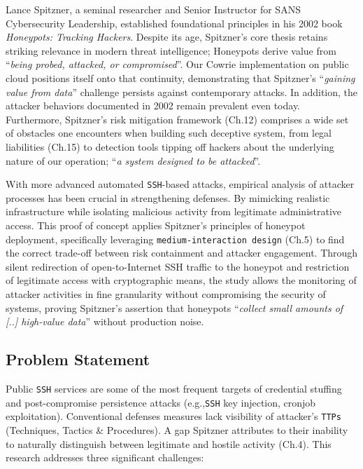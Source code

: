 \documentclass{cls/ULBreport}
\begin{document}
    Lance Spitzner, a seminal researcher and Senior Instructor for SANS Cybersecurity Leadership, established foundational principles in his 2002 book \textit{Honeypots: Tracking Hackers}. 
    Despite its age, Spitzner's core thesis retains striking relevance in modern threat intelligence; Honeypots derive value from \enquote{\textit{being probed, attacked, or compromised}}\autocite[Ch.~1, p.~23]{spitzner2002honeypots}. Our Cowrie implementation on public cloud positions itself onto that continuity, demonstrating that Spitzner's \enquote{\textit{gaining value from data}} challenge \autocite[Ch.~4, p.~67]{spitzner2002honeypots} persists against contemporary attacks. In addition, the attacker behaviors documented in 2002 remain prevalent even today. Furthermore, Spitzner's risk mitigation framework (Ch.12) comprises a wide set of obstacles one encounters when building such deceptive system, from legal liabilities (Ch.15) to detection tools tipping off hackers about the underlying nature of our operation; \enquote{\textit{a system designed to be attacked}}\autocite[Ch.~12, p.~298]{spitzner2002honeypots}. 
    
    
    With more advanced automated \texttt{SSH}-based attacks, empirical analysis of attacker processes has been crucial in strengthening defenses. By mimicking realistic infrastructure while isolating malicious activity from legitimate administrative access. This proof of concept applies Spitzner's principles of honeypot deployment, specifically leveraging \texttt{medium-interaction design} (Ch.5) to find the correct trade-off between risk containment and attacker engagement. Through silent redirection of open-to-Internet SSH traffic to the honeypot and restriction of legitimate access with cryptographic means, the study allows the monitoring of attacker activities in fine granularity without compromising the security of systems, proving Spitzner's assertion that honeypots \enquote{\textit{collect small amounts of [..] high-value data}} \autocite[Ch.~4, p.~68]{spitzner2002honeypots} without production noise.  

        \subsection{Problem Statement} 
        Public \texttt{SSH} services are some of the most frequent targets of credential stuffing and post-compromise persistence attacks (e.g.,\texttt{SSH} key injection, cronjob exploitation). Conventional defenses measures lack visibility of attacker's \texttt{TTPs} (Techniques, Tactics \& Procedures). A gap Spitzner attributes to their inability to naturally distinguish between legitimate and hostile activity (Ch.4). This research addresses three significant challenges: 
            
\end{document}
